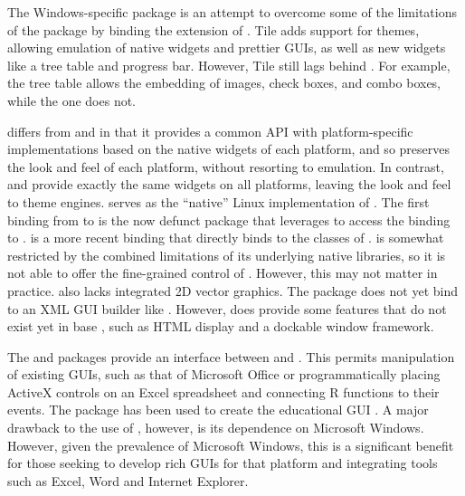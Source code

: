\documentclass[article]{jss}
\begin{document}
The Windows-specific  package \citep{tcltk2} is an attempt to overcome some
of the limitations of the  package by binding the
 extension
\citep{tcltk-tile} of . Tile adds support for themes,
allowing
emulation of native widgets and prettier GUIs, as well as new widgets
like a tree table and progress bar. However, Tile still lags behind
. For example, the  tree table allows the
embedding of images,
check boxes, and combo boxes, while the  one does not.

 \citep{wxwidgets} differs from  and
 in that it provides a common API with platform-specific
implementations based on the native widgets of each platform, and so 
preserves the look and feel of each platform, without
resorting to emulation.  In contrast,  and 
provide exactly the same widgets on all platforms, leaving the look
and feel to theme engines.   serves as the ``native'' Linux
implementation of .  The first binding from
 to  is the now defunct 
package that leverages  to access the 
binding to .   \citep{RwxWidgets} is a
more recent binding that directly binds to the  classes
of .   is somewhat restricted by the
combined limitations of its underlying native libraries, so it is not
able to offer the fine-grained control of . However, this may not matter in practice.
 also lacks integrated 2D vector graphics. The
 package does not yet bind to an XML GUI builder like
.
However,  does provide some features that
do not exist yet in base , such as HTML display and a
dockable window framework.

The  \citep{RDCOM} and  \citep{RDCOM2}
packages provide an interface between  and 
\citep{DCOM}. This permits manipulation of existing GUIs, such as that
of Microsoft Office or programmatically placing ActiveX controls on an
Excel spreadsheet and connecting R functions to their events. The
 package has been used to create the educational
 GUI  \citep{simpleR}. A major drawback to
the use of , however, is its dependence on Microsoft
Windows. However, given the prevalence of Microsoft Windows, this is a
significant benefit for those seeking to develop rich GUIs for that
platform and integrating tools such as Excel, Word and Internet
Explorer.
\end{document}
